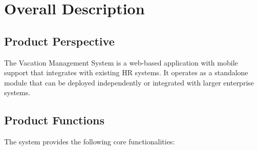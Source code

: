 \documentclass[12pt,a4paper]{article}
\begin{document}
\section{Overall Description}

\subsection{Product Perspective}
The Vacation Management System is a web-based application with mobile support that integrates with existing HR systems. It operates as a standalone module that can be deployed independently or integrated with larger enterprise systems.

\subsection{Product Functions}
The system provides the following core functionalities:
\end{document}
